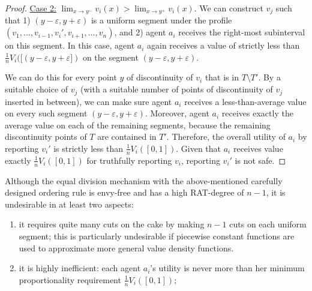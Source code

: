 \begin{proof}
    \underline{Case 2:} $\lim_{x\to y^-}v_i(x)>\lim_{x\to y^+}v_i(x)$.
    We can construct $v_j$ such that 1) $(y-\varepsilon, y+\varepsilon)$ is a uniform segment under the profile $(v_1,\ldots,v_{i-1},v_i',v_{i+1},\ldots,v_n)$, and 2) agent $a_i$ receives the right-most subinterval on this segment.
    In this case, agent $a_i$ again receives a value of strictly less than $\frac1nV_i([(y-\varepsilon, y+\varepsilon])$ on the segment $(y-\varepsilon, y+\varepsilon)$.

    We can do this for every point $y$ of discontinuity of $v_i$ that is in $T\setminus T'$.
    By a suitable choice of $v_j$ (with a suitable number of points of discontinuity of $v_j$ inserted in between), we can make sure agent $a_i$ receives a less-than-average value on every such segment $(y-\varepsilon,y+\varepsilon)$.
    Moreover, agent $a_i$ receives exactly the average value on each of the remaining segments, because the remaining discontinuity points of $T$ are contained in $T'$.
    Therefore, the overall utility of $a_i$ by reporting $v_i'$ is strictly less than $\frac1nV_i([0,1])$.
    Given that $a_i$ receives value exactly $\frac1nV_i([0,1])$ for truthfully reporting $v_i$, reporting $v_i'$ is not safe.
\end{proof}

Although the equal division mechanism with the above-mentioned carefully designed ordering rule is envy-free and has a high RAT-degree of $n-1$, it is undesirable in at least two aspects:
\begin{enumerate}
    \item it requires quite many cuts on the cake by making $n-1$ cuts on each uniform segment; this is particularly undesirable if piecewise constant functions are used to approximate more general value density functions.

    \item it is highly inefficient: each agent $a_i$'s utility is never more than her minimum proportionality requirement $\frac1nV_i([0,1])$;
\end{enumerate}




